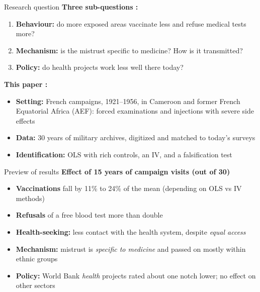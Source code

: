 \documentclass[aspectratio=1610]{beamer}
\begin{document}
\begin{frame}{Research question}
\textbf{Three sub-questions :}
      \begin{enumerate}
        \item \textbf{Behaviour:} do more exposed areas vaccinate less and refuse medical tests more?
        \item \textbf{Mechanism:} is the mistrust specific to medicine? How is it transmitted?
        \item \textbf{Policy:} do health projects work less well there today?
      \end{enumerate}
      \vspace{0.3em}
      \textbf{This paper :}
      \begin{itemize}
        \item \textbf{Setting:} French campaigns, 1921--1956, in Cameroon and former French Equatorial
          Africa (AEF): forced examinations and injections with severe side effects
        \item \textbf{Data:} 30 years of military archives, digitized and matched to today's surveys
        \item \textbf{Identification:} OLS with rich controls, an IV, and a falsification test
      \end{itemize}
\end{frame}

\begin{frame}{Preview of results}
  \textbf{Effect of 15 years of campaign visits (out of 30)}
      \begin{itemize}
        \item \textbf{Vaccinations} fall by 11\% to 24\% of the mean (depending on OLS vs IV methods)
        \item \textbf{Refusals} of a free blood test more than double
        \item \textbf{Health-seeking:} less contact with the health system, despite \emph{equal access}
        \item \textbf{Mechanism:} mistrust is \emph{specific to medicine} and passed on mostly within ethnic groups
        \item \textbf{Policy:} World Bank \emph{health} projects rated about one notch lower;
          no effect on other sectors
      \end{itemize}
\end{frame}
\end{document}
